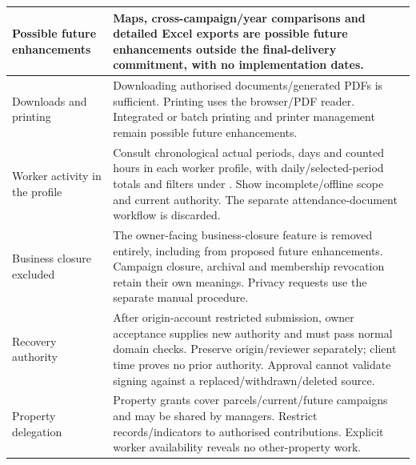 {\begin{longtable}{L{0.24}L{0.76}}
\midrule
{}\label{decision:Q-SCOPE-02}\label{decision:Q-SCOPE-03}\label{decision:Q-SCOPE-04}Possible future enhancements & Maps, cross-campaign/year comparisons and detailed Excel exports are possible future enhancements outside the final-delivery commitment, with no implementation dates. \\
\midrule
{}\label{decision:Q-SCOPE-05}Downloads and printing & Downloading authorised documents/generated PDFs is sufficient. Printing uses the browser/PDF reader. Integrated or batch printing and printer management remain possible future enhancements. \\
\midrule
{}\label{decision:Q-SCOPE-06}Worker activity in the profile & Consult chronological actual periods, days and counted hours in each worker profile, with daily/selected-period totals and filters under . Show incomplete/offline scope and current authority. The separate attendance-document workflow is discarded. \\
\midrule
{}\label{decision:Q-SCOPE-07}Business closure excluded & The owner-facing business-closure feature is removed entirely, including from proposed future enhancements. Campaign closure, archival and membership revocation retain their own meanings. Privacy requests use the separate manual procedure. \\
\midrule
{}\label{decision:D-08}\label{decision:Q-NFR-06}Recovery authority & After origin-account restricted submission, owner acceptance supplies new authority and must pass normal domain checks. Preserve origin/reviewer separately; client time proves no prior authority. Approval cannot validate signing against a replaced/withdrawn/deleted source. \\
\midrule
{}\label{decision:Q-AA-02}Property delegation & Property grants cover parcels/current/future campaigns and may be shared by managers. Restrict records/indicators to authorised contributions. Explicit worker availability reveals no other-property work. \\

\end{longtable}}
